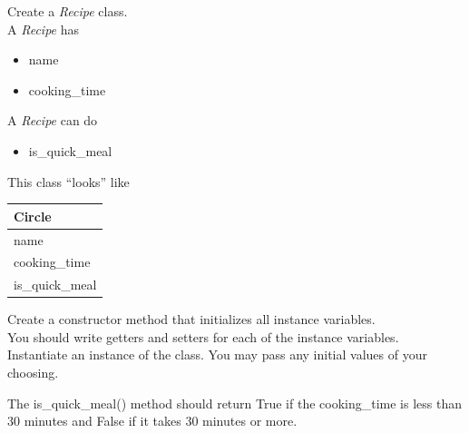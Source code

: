 \documentclass{article}
\begin{document}
\begin{enumerate}
\pagebreak




	\begin{minipage}{.6\textwidth}
		\item Create a \textit{Recipe} class.\\
		A \textit{Recipe} has
		\begin{itemize}
			\item name 
			\item cooking\_time
		\end{itemize}

		A \textit{Recipe} can do
		\begin{itemize}
			\item is\_quick\_meal
		\end{itemize}
	\end{minipage}
	\begin{minipage}{.4\textwidth}
		This class ``looks'' like 
				
		\vspace*{1em}
		\begin{tabular}{|l|}
			\hline Circle\\ \hline
			name\\ cooking\_time \\  \hline
			is\_quick\_meal\\ \hline
		\end{tabular}
	\end{minipage}

	\vspace*{2ex}
	Create a constructor method that initializes all instance variables.\\
	You should write getters and setters for each of the instance variables.\\
	Instantiate an instance of the class. You may pass any initial values of your choosing.	

	The is\_quick\_meal() method should return True if the cooking\_time is less than 30 minutes and False 
	if it takes 30 minutes or more.\\
		

\end{enumerate}
\end{document}

